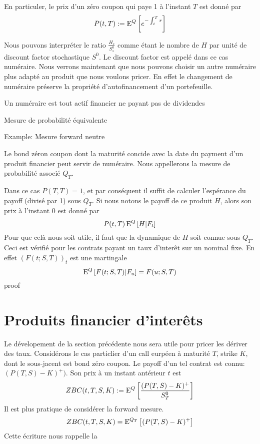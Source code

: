 En particuler, le prix d'un zéro coupon qui paye 1 à l'instant $T$ est donné par
$$ P(t, T) := \mathrm{E}^Q \left[   e^{-\int_t^T r}  \right] $$


Nous pouvons interpréter le ratio $\frac{H_s}{ S^0_s}$ comme étant le nombre  de $H$ par unité de discount factor stochastique $S^0$. Le discount factor est appelé dans ce cas numéraire. Nous verrons maintenant que nous pouvons choisir un autre numéraire plus adapté au produit que nous voulons pricer.
En effet le changement de numéraire préserve la propriété d'autofinancement d'un portefeuille.

\begin{defn} Un numéraire est tout actif financier ne payant pas de dividendes \end{defn}

\begin{defn} Mesure de probabilité équivalente


\end{defn}

Example: Mesure forward neutre

Le bond zéron coupon dont la maturité concide avec la date du payment d'un produit financier peut servir de numéraire. Nous appellerons la mesure de probabilité associé $Q_T$.

Dans ce cas $P(T, T) = 1$, et par conséquent il suffit de calculer l'espérance du payoff (divisé par 1) sous $Q_T$.
Si nous notons le payoff de ce produit $H$, alors son prix à l'instant $0$ est donné par $$P(t, T) \, \mathrm{E}^Q \left[  H | F_t  \right] $$
Pour que celà nous soit utile, il faut que la dynamique de $H$ soit connue sous $Q_T$. Ceci est vérifié pour les contrats payant un taux d'interêt sur un nominal fixe. En effet $(F(t; S, T))_t$ est une martingale 
$$ \mathrm{E}^Q \left[  F(t; S, T) | F_u  \right] = F(u; S, T)$$
proof



\newpage

\section{Produits financier d'interêts}

Le dévelopement de la section précédente nous sera utile pour pricer les dériver des taux.
Considérons le cas particlier d'un call eurpéen à maturité $T$, strike $K$, dont le sous-jacent est bond zéro coupon. Le payoff d'un tel contrat est connu: $ (P(T, S) - K)^+)$. Son prix à un instant antérieur $t$ est
$$ZBC(t, T, S, K) := \mathrm{E}^Q \left[  \frac{(P(T, S) - K)^+}{S^0_T}  \right]$$
Il est plus pratique de considérer la forward mesure. 
$$ZBC(t, T, S, K) = \mathrm{E}^{Q_T} \left[ (P(T, S) - K)^+ \right]$$
Cette écriture nous rappelle la 

